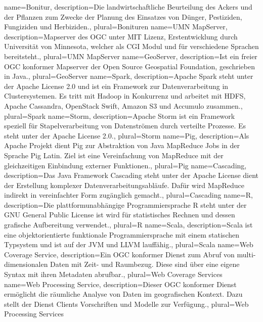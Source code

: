 {
  name=Bonitur,
  description={Die landwirtschaftliche Beurteilung des Ackers und der Pflanzen zum Zwecke der Planung des Einsatzes von Dünger, Pestiziden, Fungiziden und Herbiziden.},
  plural=Bonituren
}
{
  name=UMN MapServer,
  description={Mapserver des OGC unter MIT Lizenz, Erstentwicklung durch Universität von Minnesota, welcher als CGI Modul und für verschiedene Sprachen  bereitsteht.},
  plural=UMN MapServer
}
{
  name=GeoServer,
  description={Ist ein freier OGC konformer Mapserver der Open Source Geospatial Foundation, geschrieben in Java.},
  plural=GeoServer
}
{
  name=Spark,
  description={Apache Spark steht unter der Apache License 2.0 und ist ein Framework zur Datenverarbeitung in Clustersystemen. Es tritt mit Hadoop in Konkurrenz und arbeitet mit HDFS, Apache Cassandra, OpenStack Swift, Amazon S3 und Accumulo zusammen.},
  plural=Spark
}
{
  name=Storm,
  description={Apache Storm ist ein Framework speziell für Stapelverarbeitung von Datenströmen durch verteilte Prozesse. Es steht unter der Apache License 2.0.},
  plural=Storm
}
{
  name=Pig,
  description={Als Apache Projekt dient Pig zur Abstraktion von Java MapReduce Jobs in der Sprache Pig Latin. Ziel ist eine Vereinfachung von MapReduce mit der gleichzeitigen Einbindung externer Funktionen.},
  plural=Pig
}
{
  name=Cascading,
  description={Das Java Framework Cascading steht unter der Apache License dient der Erstellung komplexer Datenverarbeitungsabläufe. Dafür wird MapReduce indirekt in vereinfachter Form zugänglich gemacht.},
  plural=Cascading
}
{
  name=R,
  description={Die plattformunabhängige Programmiersprache R steht unter der GNU General Public License ist wird für statistisches Rechnen und dessen grafische Aufbereitung verwendet.},
  plural=R
}
{
  name=Scala,
  description={Scala ist eine objektorientierte funktionale Programmiersprache mit einem statischen Typsystem und ist auf der JVM und LLVM lauffähig.},
  plural=Scala
}
{
  name=Web Coverage Service,
  description={Ein OGC konformer Dienst zum Abruf von multi-dimensionalen Daten mit Zeit- und Raumbezug. Diese sind über eine eigene Syntax mit ihren Metadaten abrufbar.},
  plural=Web Coverage Services
}
{
  name=Web Processing Service,
  description={Dieser OGC konformer Dienst ermöglicht die räumliche Analyse von Daten im geografischen Kontext. Dazu stellt der Dienst Clients Vorschriften und Modelle zur Verfügung.},
  plural=Web Processing Services
}

